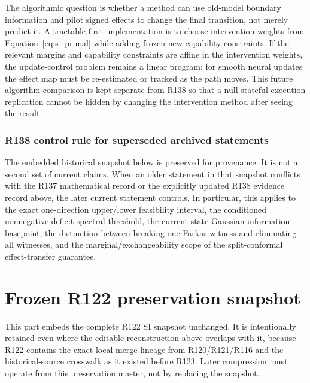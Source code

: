 \documentclass[11pt,letterpaper]{article}
\theoremstyle{plain}
\newcommand{\1}{\mathbf 1}
\begin{document}
The algorithmic question is whether a method can use old-model boundary information and pilot signed effects to change the final transition, not merely predict it. A tractable first implementation is to choose intervention weights from Equation~\ref{eq:s_primal} while adding frozen new-capability constraints. If the relevant margins and capability constraints are affine in the intervention weights, the update-control problem remains a linear program; for smooth neural updates the effect map must be re-estimated or tracked as the path moves. This future algorithm comparison is kept separate from R138 so that a null stateful-execution replication cannot be hidden by changing the intervention method after seeing the result.


\clearpage
\section{R138 control rule for superseded archived statements}
The embedded historical snapshot below is preserved for provenance. It is not a second set of current claims. When an older statement in that snapshot conflicts with the R137 mathematical record or the explicitly updated R138 evidence record above, the later current statement controls. In particular, this applies to the exact one-direction upper/lower feasibility interval, the conditioned nonnegative-deficit spectral threshold, the current-state Gaussian information basepoint, the distinction between breaking one Farkas witness and eliminating all witnesses, and the marginal/exchangeability scope of the split-conformal effect-transfer guarantee.

\clearpage
\part{Frozen R122 preservation snapshot}
This part embeds the complete R122 SI snapshot unchanged. It is intentionally retained even where the editable reconstruction above overlaps with it, because R122 contains the exact local merge lineage from R120/R121/R116 and the historical-source crosswalk as it existed before R123. Later compression must operate from this preservation master, not by replacing the snapshot.

\end{document}
